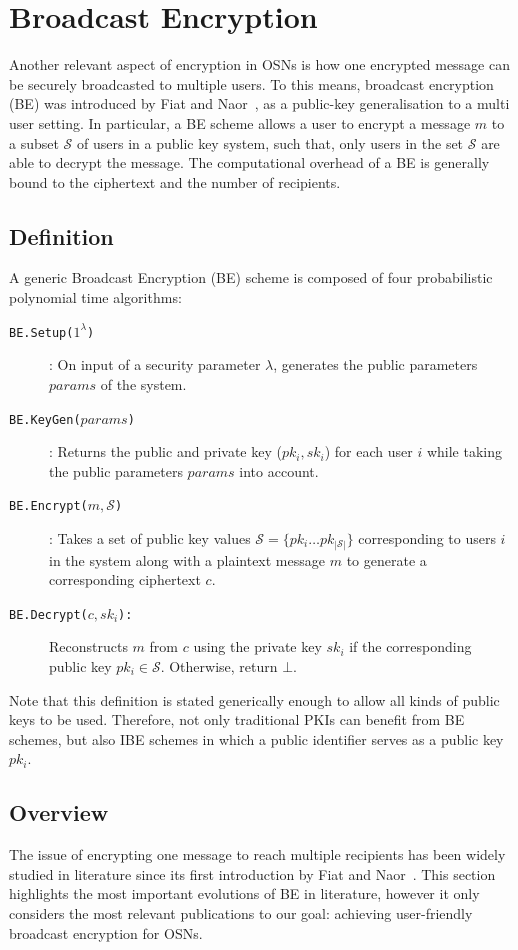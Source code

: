 \section{Broadcast Encryption}
Another relevant aspect of encryption in OSNs is how one encrypted message can be securely broadcasted to multiple users. To this means, broadcast encryption (BE) was introduced by Fiat and Naor~\cite{art:FiatN93}, as a public-key generalisation to a multi user setting. In particular, a BE scheme allows a user to encrypt a message $m$ to a subset $\mathcal{S}$ of users in a public key system, such that, only users in the set $\mathcal{S}$ are able to decrypt the message. The computational overhead of a BE is generally bound to the ciphertext and the number of recipients.

\subsection{Definition}
A generic Broadcast Encryption (BE) scheme is composed of four probabilistic polynomial time algorithms:

\begin{description}
    \item[\texttt{BE.Setup($1^{\lambda}$)}]: On input of a security parameter $\lambda$, generates the public parameters $params$ of the system.
    \item[\texttt{BE.KeyGen($params$)}]: Returns the public and private key ($pk_i,sk_i$) for each user $i$ while taking the public parameters $params$ into account.
    \item[\texttt{BE.Encrypt($m, \mathcal{S}$)}]: Takes a set of public key values $\mathcal{S}=\{pk_i \ldots pk_{|\mathcal{S}|}\}$ corresponding to users $i$ in the system along with a plaintext message $m$ to generate a corresponding ciphertext $c$.
    \item[\texttt{BE.Decrypt($c, sk_i$):}] Reconstructs $m$ from $c$ using the private key $sk_i$ if the corresponding public key $pk_i \in \mathcal{S}$. Otherwise, return $\bot$.
\end{description}

Note that this definition is stated generically enough to allow all kinds of public keys to be used. Therefore, not only traditional PKIs can benefit from BE schemes, but also IBE schemes in which a public identifier  serves as a public key $pk_i$.

\subsection{Overview}
\label{sec:evolution_of_be}
The issue of encrypting one message to reach multiple recipients has been widely studied in literature since its first introduction by Fiat and Naor~\cite{art:FiatN93}. This section highlights the most important evolutions of BE in literature, however it only considers the most relevant publications to our goal: achieving user-friendly broadcast encryption for OSNs.

